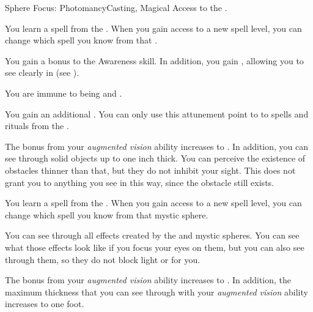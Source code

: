    \begin{feat}{Sphere Focus: Photomancy}{Casting, Magical}
        \featpre Access to the  .

         You learn a spell from the  .
        When you gain access to a new spell level, you can change which spell you know from that .

         You gain a  bonus to the Awareness skill.
        In addition, you gain , allowing you to see clearly in  (see ).

         You are immune to being \dazzled and \blinded.

         You gain an additional .
        You can only use this attunement point to  to spells and rituals from the  .

         The bonus from your \textit{augmented vision} ability increases to .
        In addition, you can see through solid objects up to one inch thick.
        You can perceive the existence of obstacles thinner than that, but they do not inhibit your sight.
        This does not grant you  to anything you see in this way, since the obstacle still exists.

         You learn a spell from the  .
        When you gain access to a new spell level, you can change which spell you know from that mystic sphere.

         You can see through all effects created by the  and  mystic spheres.
        You can see what those effects look like if you focus your eyes on them, but you can also see through them, so they do not block light or  for you.

         The bonus from your \textit{augmented vision} ability increases to .
        In addition, the maximum thickness that you can see through with your \textit{augmented vision} ability increases to one foot.
    \end{feat}

